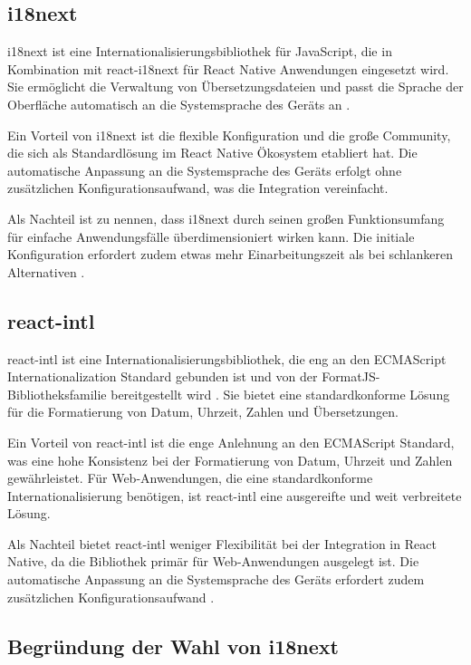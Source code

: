 \subsection{i18next}

i18next ist eine Internationalisierungsbibliothek für JavaScript, die 
in Kombination mit react-i18next für React Native Anwendungen eingesetzt 
wird. Sie ermöglicht die Verwaltung von Übersetzungsdateien und passt 
die Sprache der Oberfläche automatisch an die Systemsprache des Geräts 
an \cite{i18n-docs}.

Ein Vorteil von i18next ist die flexible Konfiguration und die große 
Community, die sich als Standardlösung im React Native Ökosystem 
etabliert hat. Die automatische Anpassung an die Systemsprache des 
Geräts erfolgt ohne zusätzlichen Konfigurationsaufwand, was die 
Integration vereinfacht.

Als Nachteil ist zu nennen, dass i18next durch seinen großen 
Funktionsumfang für einfache Anwendungsfälle überdimensioniert 
wirken kann. Die initiale Konfiguration erfordert zudem etwas 
mehr Einarbeitungszeit als bei schlankeren Alternativen \cite{i18n-docs}.

\subsection{react-intl}

react-intl ist eine Internationalisierungsbibliothek, die eng an den 
ECMAScript Internationalization Standard gebunden ist und von der 
FormatJS-Bibliotheksfamilie bereitgestellt wird \cite{react-intl-docs}. 
Sie bietet eine standardkonforme Lösung für die Formatierung von 
Datum, Uhrzeit, Zahlen und Übersetzungen.

Ein Vorteil von react-intl ist die enge Anlehnung an den ECMAScript 
Standard, was eine hohe Konsistenz bei der Formatierung von Datum, 
Uhrzeit und Zahlen gewährleistet. Für Web-Anwendungen, die eine 
standardkonforme Internationalisierung benötigen, ist react-intl 
eine ausgereifte und weit verbreitete Lösung.

Als Nachteil bietet react-intl weniger Flexibilität bei der Integration 
in React Native, da die Bibliothek primär für Web-Anwendungen ausgelegt 
ist. Die automatische Anpassung an die Systemsprache des Geräts erfordert 
zudem zusätzlichen Konfigurationsaufwand \cite{react-intl-docs}.

\subsection{Begründung der Wahl von i18next}

